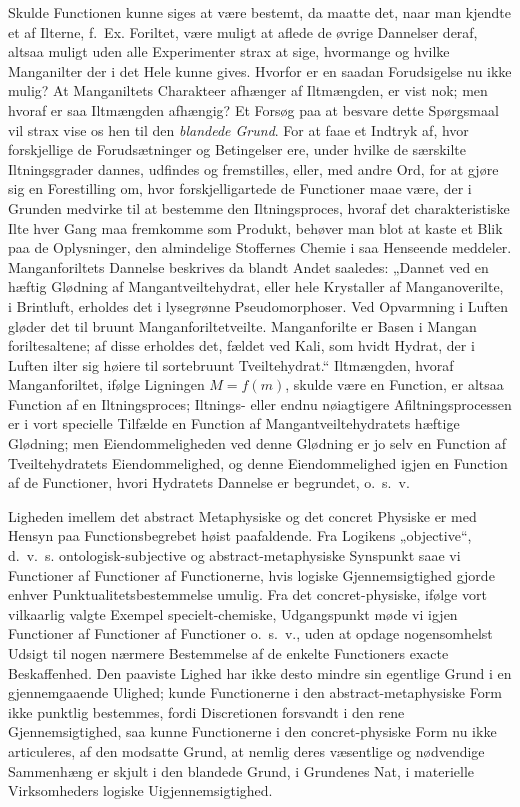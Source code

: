 \documentclass[12pt]{book}
\newcommand{\apage}[1]{\marginnote{\footnotesize\textit{[#1]}}}
\begin{document}
Skulde Functionen kunne siges at være bestemt, da maatte det, naar man kjendte et af
Ilterne, f.\ Ex. Foriltet, være muligt at aflede de øvrige Dannelser deraf, altsaa
muligt uden alle Experimenter strax at sige, hvormange og hvilke Manganilter der i det
Hele kunne gives. Hvorfor er en saadan Forudsigelse nu ikke mulig? At Manganiltets
Charakteer afhænger af Iltmængden, er vist nok; men hvoraf er saa Iltmængden afhængig?
Et Forsøg paa at besvare dette Spørgsmaal vil strax vise os hen til den
\emph{blandede Grund}. For at faae et Indtryk af, hvor forskjellige de Forudsætninger
og Betingelser ere, under hvilke de særskilte Iltningsgrader dannes, udfindes og
fremstilles, eller, med andre Ord, for at gjøre sig en Forestilling om, hvor
forskjelligartede de Functioner maae være, der i Grunden medvirke til at bestemme den
Iltningsproces, hvoraf det charakteristiske Ilte hver Gang maa fremkomme som Produkt,
behøver man blot at kaste et Blik paa de Oplysninger, den almindelige Stoffernes
Chemie i saa Henseende meddeler. Manganforiltets Dannelse beskrives da blandt Andet
saaledes: „Dannet ved en hæftig Glødning af Mangantveiltehydrat, eller hele Krystaller
af Manganoverilte, i Brintluft, erholdes det i lysegrønne Pseudomorphoser. Ved
Opvarmning i Luften gløder det til bruunt Manganforiltetveilte. Manganforilte er Basen
i Mangan\-%
 \apage{326}foriltesaltene; af disse erholdes det, fældet ved Kali, som hvidt Hydrat, der i Luften
ilter sig høiere til sortebruunt Tveiltehydrat.“ Iltmængden, hvoraf Manganforiltet,
ifølge Ligningen $M = f(m)$, skulde være en Function, er altsaa Function af en
Iltningsproces; Iltnings- eller endnu nøiagtigere Afiltningsprocessen er i vort
specielle Tilfælde en Function af Mangantveiltehydratets hæftige Glødning; men
Eiendommeligheden ved denne Glødning er jo selv en Function af Tveiltehydratets
Eiendommelighed, og denne Eiendommelighed igjen en Function af de Functioner, hvori
Hydratets Dannelse er begrundet, o.\ s.\ v.

Ligheden imellem det abstract Metaphysiske og det concret Physiske er med Hensyn paa
Functionsbegrebet høist paafaldende. Fra Logikens „objective“, d.\ v.\ s.
ontologisk-subjective og abstract-metaphysiske Synspunkt saae vi Functioner af
Functioner af Functionerne, hvis logiske Gjennemsigtighed gjorde enhver
Punktualitetsbestemmelse umulig. Fra det concret-physiske, ifølge vort vilkaarlig
valgte Exempel specielt-chemiske, Udgangspunkt møde vi igjen Functioner af Functioner
af Functioner o.\ s.\ v., uden at opdage nogensomhelst Udsigt til nogen nærmere
Bestemmelse af de enkelte Functioners exacte Beskaffenhed. Den paaviste Lighed har
ikke desto mindre sin egentlige Grund i en gjennemgaaende Ulighed; kunde Functionerne
i den abstract-metaphysiske Form ikke punktlig bestemmes, fordi Discretionen
forsvandt i den rene Gjennemsigtighed, saa kunne Functionerne i den concret-physiske
Form nu ikke articuleres, af den modsatte Grund, at nemlig deres væsentlige og
nødvendige Sammenhæng er skjult i den blandede Grund, i Grundenes Nat, i materielle
Virksomheders logiske Uigjennemsigtighed.
\end{document}
